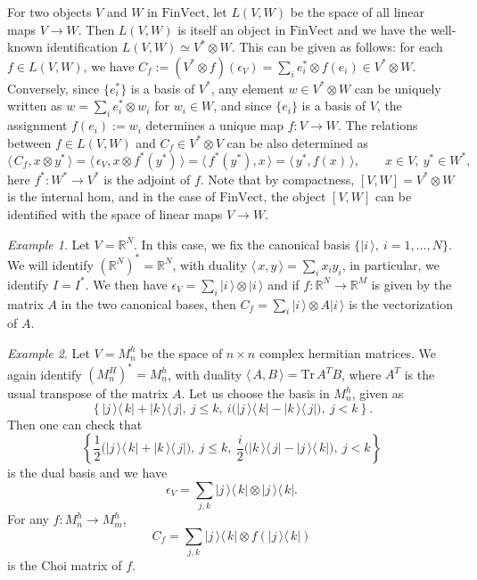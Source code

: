 \documentclass[12pt]{article}
\theoremstyle{definition}
\theoremstyle{remark}
\newtheorem{exm}{Example}
\def \Tr{\mathrm{Tr}\,}
\def\<{\langle\,}
\def\>{\,\rangle}
\def \FV{\mathrm{FinVect}}
\begin{document}
For two objects $V$ and $W$ in $\FV$, let $L(V,W)$ be the space of all linear maps $V\to
W$. Then $L(V,W)$ is itself an object in $\FV$ and  we have the well-known identification 
$L(V,W)\simeq V^*\otimes W$. This can be given as follows: for each $f\in L(V,W)$, we have 
$C_f:=(V^*\otimes f)(\epsilon_V)=\sum_i e_i^*\otimes f(e_i)\in V^*\otimes W$. Conversely,
since $\{e_i^*\}$ is a basis of $V^*$, 
any element $w\in V^*\otimes W$ can be uniquely written as $w=\sum_i e_i^*\otimes w_i$ for
$w_i\in W$, and since $\{e_i\}$ is a basis of $V$, the assignment $f(e_i):=w_i$ determines a
unique map $f:V\to W$. The relations between $f\in L(V,W)$ and $C_f\in V^*\otimes V$ can be also determined as
\[
\<C_f,x\otimes y^*\>=\<\epsilon_V,x\otimes f^*(y^*)\>=\<f^*(y^*),x\>=\<y^*,f(x)\>,\qquad x\in
V,\ y^*\in W^*,
\]
here $f^*:W^*\to V^*$ is the adjoint of $f$.
Note that by compactness, $[V,W]=V^*\otimes W$ is the internal hom,
and in the case of $\FV$, the object $[V,W]$ can be identified with the space of linear
maps $V\to W$. 


\begin{exm} Let $V=\mathbb R^N$. In this case, we fix the canonical basis $\{|i\>,\
i=1,\dots,N\}$. We will identify $(\mathbb R^N)^*=\mathbb R^N$, with duality
$\<x,y\>=\sum_i x_iy_i$, in particular, we identify $I=I^*$. We then have
$\epsilon_V=\sum_i |i\>\otimes |i\>$ and if $f:\mathbb R^N\to \mathbb R^M$ is given by the
matrix $A$ in the two canonical bases, then  $C_f=\sum_i |i\>\otimes A|i\>$ is the
vectorization of $A$.

\end{exm}


\begin{exm} Let $V=M_n^h$ be the space of $n\times n$ complex hermitian matrices. We again
identify $(M_n^H)^*=M_n^h$, with duality $\<A,B\>=\Tr A^TB$, where $A^T$ is the usual
transpose of the matrix $A$. Let us choose the basis in $M_n^h$, given as
\[
\left\{|j\>\<k|+|k\>\<j|,\ j\le k,\ i\biggl(|j\>\<k|-|k\>\<j|\biggr),\ j<k\right\}.
\]
Then one can check that
\[
\left\{\frac12\biggl(|j\>\<k|+|k\>\<j|\biggl),\ j\le k,\
\frac{i}{2}\biggl(|k\>\<j|-|j\>\<k|\biggr),\ j<k\right\}
\]
is the dual basis and we have
\[
\epsilon_V=\sum_{j,k} |j\>\<k|\otimes |j\>\<k|.
\]
For any $f:M_n^h\to M_m^h$, 
\[
C_f=\sum_{j,k} |j\>\<k|\otimes f(|j\>\<k|)
\]
is the Choi matrix of $f$.

\end{exm}
\end{document}
